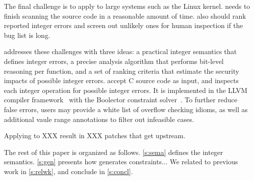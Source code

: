 The final challenge is to apply \sys to large systems such as the
Linux kernel.  \sys needs to finish scanning the source code in a
reasonable amount of time.  \sys also should rank reported integer
errors and screen out unlikely ones for human inspection if the bug
list is long.

\sys addresses these challenges with three ideas: a practical integer
semantics that defines integer errors, a precise analysis algorithm
that performs bit-level reasoning per function, and a set of ranking
criteria that estimate the security impacts of possible integer
errors.  \sys accept C source code as input, and inspects each
integer operation for possible integer errors.
%
It is implemented in the LLVM compiler framework~\cite{lattner:llvm}
with the Boolector constraint solver~\cite{boolector}.
%
To further reduce false errors, users may provide a white list of
overflow checking idioms, as well as additional vaule range annotations
to filter out infeasible cases.

Applying \sys to XXX result in XXX patches that get upstream.


The rest of this paper is organized as follows. \autoref{s:sema}
defines the integer semantics.  \autoref{s:gen} presents how \sys generates
constraints...  We related \sys to previous work in \autoref{s:relwk},
and conclude in \autoref{s:concl}.
